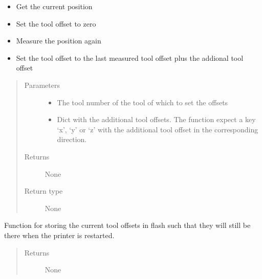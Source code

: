 \documentclass[letterpaper,10pt,english]{sphinxmanual}
\begin{document}
\begin{fulllineitems}
\begin{fulllineitems}
\begin{itemize}
\item {} 
\sphinxAtStartPar
Get the current position

\item {} 
\sphinxAtStartPar
Set the tool offset to zero

\item {} 
\sphinxAtStartPar
Measure the position again

\item {} 
\sphinxAtStartPar
\sphinxhyphen{}Set the tool offset to the last measured tool offset plus the addional tool offset

\end{itemize}
\begin{quote}\begin{description}
\item[{Parameters}] \leavevmode\begin{itemize}
\item {} 
\sphinxAtStartPar
{} \textendash{} The tool number of the tool of which to set the offsets

\item {} 
\sphinxAtStartPar
{} \textendash{} Dict with the additional tool offsets. The function expect a key ‘x’, ‘y’ or ‘z’ with the additional tool offset in the corresponding direction.

\end{itemize}

\item[{Returns}] \leavevmode
\sphinxAtStartPar
None

\item[{Return type}] \leavevmode
\sphinxAtStartPar
None

\end{description}\end{quote}

\end{fulllineitems}


\begin{fulllineitems}
\label{\detokenize{index:diabase.diabase.store_offset_parameters}}
\sphinxAtStartPar
Function for storing the current tool offsets in flash such that they will still be there when the printer is restarted.
\begin{quote}\begin{description}
\item[{Returns}] \leavevmode
\sphinxAtStartPar
None


\end{description}
\end{quote}
\end{fulllineitems}
\end{fulllineitems}
\end{document}
